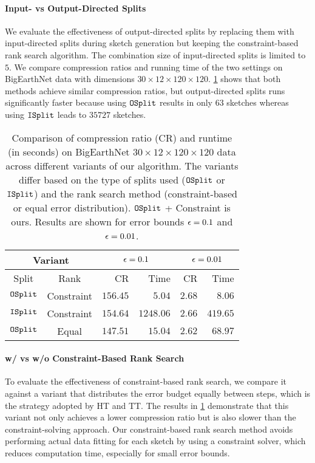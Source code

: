 \paragraph{Input- vs Output-Directed Splits}
%
We evaluate the effectiveness of output-directed splits by replacing them with input-directed splits during sketch generation but keeping the constraint-based rank search algorithm.
%
The combination size of input-directed splits is limited to $5$.
%
We compare compression ratios and running time of the two settings on BigEarthNet data with dimensions $30\times 12 \times 120 \times 120$.
%
\cref{tab:ablation} shows that both methods achieve similar compression ratios, but output-directed splits runs significantly faster because using $\mathtt{OSplit}$ results in only $63$ sketches whereas using $\mathtt{ISplit}$ leads to $35727$ sketches.
\begin{table}[t]
    \small
    \centering
    \caption{Comparison of compression ratio (CR) and runtime (in seconds) on BigEarthNet $30\times 12 \times 120 \times 120$ data across different variants of our algorithm\footnotemark. The variants differ based on the type of splits used ($\mathtt{OSplit}$ or $\mathtt{ISplit}$) and the rank search method (constraint-based or equal error distribution). $\mathtt{OSplit}$ + Constraint is ours. Results are shown for error bounds $\epsilon=0.1$ and $\epsilon=0.01$.}
    \label{tab:ablation}
    \begin{tabular}{cc|rr|rr}
        \toprule
        \multicolumn{2}{c|}{Variant} & \multicolumn{2}{c|}{$\epsilon = 0.1$} & \multicolumn{2}{c}{$\epsilon = 0.01$} \\
        \midrule
        Split & Rank & CR & Time & CR & Time \\
        \midrule
        $\mathtt{OSplit}$ & Constraint & $156.45$ & $\mathbf{5.04}$ & $2.68$ & $\mathbf{8.06}$\\
        $\mathtt{ISplit}$ & Constraint & $154.64$ & $1248.06$ & $2.66$ & $419.65$\\
        $\mathtt{OSplit}$ & Equal & $147.51$ & $15.04$ & $2.62$ & $68.97$\\
        \bottomrule
    \end{tabular}
    \vspace{-20pt}
\end{table}

\paragraph{w/ vs w/o Constraint-Based Rank Search}
%
To evaluate the effectiveness of constraint-based rank search, we compare it against a variant that distributes the error budget equally between steps, which is the strategy adopted by HT and TT.
%
The results in \cref{tab:ablation} demonstrate that this variant not only achieves a lower compression ratio but is also slower than the constraint-solving approach.
%
Our constraint-based rank search method avoids performing actual data fitting for each sketch by using a constraint solver, which reduces computation time, especially for small error bounds.

